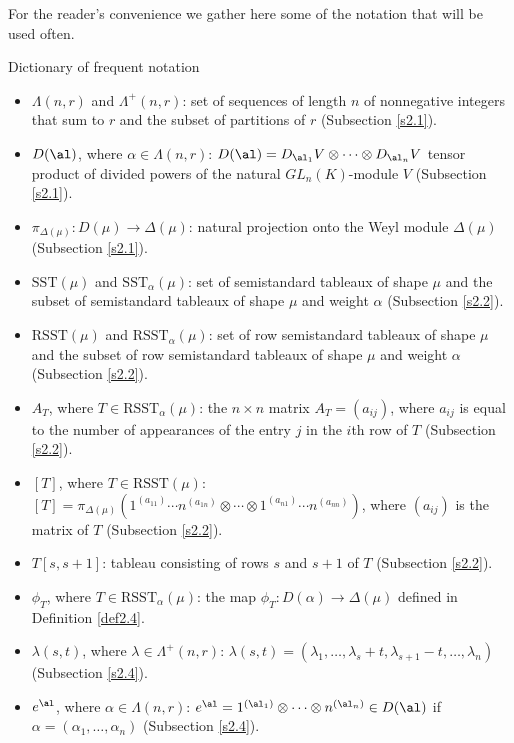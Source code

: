  For the reader’s convenience we gather here some of the notation that will be used often. 
 \begin{center}
 	Dictionary of frequent notation
 \end{center}
{\small \begin{itemize}
	
 \item $\Lambda(n,r)$ and $\Lambda^+(n,r)$: set of sequences of length $n$ of nonnegative integers that sum to $r$ and the subset of partitions of $r$ (Subsection \ref{s2.1}).
	\item $D(\al)$, where $\alpha \in \Lambda(n,r)$: $D(\al)=D_{\al_1}V\otimes \dots \otimes D_{\al_n}V$ tensor product of divided powers of the natural $GL_n(K)$-module $V$ (Subsection \ref{s2.1}).
	\item $\pi_{\Delta(\mu)}:D(\mu) \to \Delta(\mu)$: natural projection onto the Weyl module $\Delta(\mu)$ (Subsection \ref{s2.1}).
	\item $\mathrm{SST}(\mu)$ and $\mathrm{SST}_{\alpha}(\mu)$: set of semistandard tableaux of shape $\mu$ and the subset of semistandard tableaux of shape $\mu$ and weight $\alpha$ (Subsection \ref{s2.2}).
	\item $\mathrm{RSST}(\mu)$ and $\mathrm{RSST}_{\alpha}(\mu)$: set of row semistandard tableaux of shape $\mu$ and the subset of row semistandard tableaux of shape $\mu$ and weight $\alpha$ (Subsection \ref{s2.2}).
	\item $A_T$, where $T \in \mathrm{RSST}_{\alpha}(\mu)$: the $n \times n$ matrix $A_T=(a_{ij})$, where $a_{ij}$ is equal to the number of appearances of the entry $j$ in the $i$th row of $T$ (Subsection \ref{s2.2}).
	\item $[T]$, where $ T \in \mathrm{RSST}(\mu)$: $[T]=\pi_{\Delta(\mu)}(1^{(a_{11})} \cdots n^{(a_{1n})} \otimes \cdots \otimes 1^{(a_{n1})} \cdots n^{(a_{nn})})$, where $(a_{ij})$ is the matrix of $T$ (Subsection \ref{s2.2}). 
	\item $T[s,s+1]$: tableau consisting of rows $s$ and $s+1$ of $T$ (Subsection \ref{s2.2}).
	\item $\phi_T$, where $T \in \mathrm{RSST}_{\alpha}(\mu)$: the map $\phi_T: D(\alpha) \to \Delta(\mu)$ defined in Definition \ref{def2.4}.
	\item $\lambda({s,t})$, where $\lambda \in \Lambda^+(n,r)$: $\lambda({s,t})=(\lambda_1, \dots, \lambda_s+t, \lambda_{s+1}-t,\dots, \lambda_n)$ (Subsection \ref{s2.4}).
	\item $e^{\al}$, where $\alpha \in \Lambda(n,r)$: $e^{\al} =1^{(\al_1)} \otimes \cdots \otimes n^{(\al_n)} \in D(\al)$ if $\alpha =(\alpha_1, \dots, \alpha_n)$ (Subsection \ref{s2.4}).


\end{itemize}}
